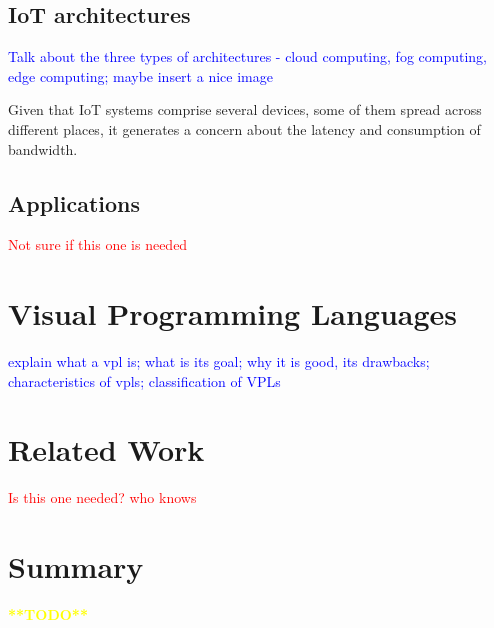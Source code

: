 \subsection{IoT architectures}\label{sec:architectures}

\textcolor{blue}{Talk about the three types of architectures - cloud computing, fog computing, edge computing; maybe insert a nice image}

Given that IoT systems comprise several devices, some of them spread across different places, it generates a concern about the latency and consumption of bandwidth. 

\subsection{Applications}\label{sec:iot_applications}

\textcolor{red}{Not sure if this one is needed}

\section{Visual Programming Languages}\label{sec:background_vpl}

\textcolor{blue}{explain what a vpl is; what is its goal; why it is good, its drawbacks; characteristics of vpls; classification of VPLs}

\section{Related Work}

\textcolor{red}{Is this one needed? who knows}

\section{Summary}

\textcolor{yellow}{\textbf{**TODO**}}
